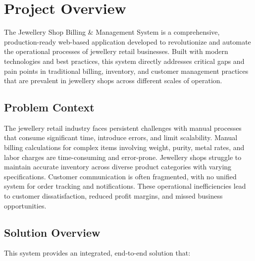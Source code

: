 \documentclass[12pt,a4paper]{report}
\begin{document}
\section{Project Overview}

The Jewellery Shop Billing \& Management System is a comprehensive, production-ready web-based application developed to revolutionize and automate the operational processes of jewellery retail businesses. Built with modern technologies and best practices, this system directly addresses critical gaps and pain points in traditional billing, inventory, and customer management practices that are prevalent in jewellery shops across different scales of operation.

\subsection{Problem Context}

The jewellery retail industry faces persistent challenges with manual processes that consume significant time, introduce errors, and limit scalability. Manual billing calculations for complex items involving weight, purity, metal rates, and labor charges are time-consuming and error-prone. Jewellery shops struggle to maintain accurate inventory across diverse product categories with varying specifications. Customer communication is often fragmented, with no unified system for order tracking and notifications. These operational inefficiencies lead to customer dissatisfaction, reduced profit margins, and missed business opportunities.

\subsection{Solution Overview}

This system provides an integrated, end-to-end solution that:
\end{document}
